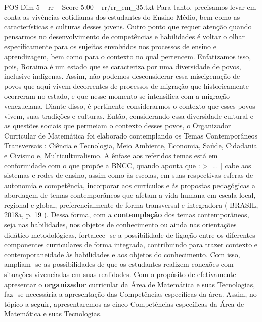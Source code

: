\begin{textsample}{POS Dim 5 – rr – Score 5.00 – rr/rr\_em\_35.txt}
Para tanto, precisamos levar em conta as vivências cotidianas dos estudantes do Ensino Médio, bem como as características e culturas desses jovens.
Outro ponto que requer atenção quando pensarmos no desenvolvimento de competências e habilidades é voltar o olhar especificamente para os sujeitos envolvidos nos processos de ensino e aprendizagem, bem como para o contexto no qual pertencem.
Enfatizamos isso, pois, Roraima é um estado que se caracteriza por uma diversidade de povos, inclusive indígenas.
Assim, não podemos desconsiderar essa miscigenação de povos que aqui vivem decorrentes de processos de migração que historicamente ocorreram no estado, e que nesse momento se intensifica com a migração venezuelana.
Diante disso, é pertinente considerarmos o contexto que esses povos vivem, suas tradições e culturas.
Então, considerando essa diversidade cultural e as questões sociais que permeiam o contexto desses povos, o Organizador Curricular de Matemática foi elaborado contemplando os Temas Contemporâneos Transversais : Ciência e Tecnologia, Meio Ambiente, Economia, Saúde, Cidadania e Civismo e, Multiculturalismo.
A ênfase aos referidos temas está em conformidade com o que propõe a BNCC, quando aponta que : > [... ] cabe aos sistemas e redes de ensino, assim como às escolas, em suas respectivas esferas de autonomia e competência, incorporar aos currículos e às propostas pedagógicas a abordagem de temas contemporâneos que afetam a vida humana em escala local, regional e global, preferencialmente de forma transversal e integradora ( BRASIL, 2018a, p. 19 ).
Dessa forma, com a \textbf{contemplação} dos temas contemporâneos, seja nas habilidades, nos objetos de conhecimento ou ainda nas orientações didático metodológicas, fortalece -se a possibilidade de ligação entre os diferentes componentes curriculares de forma integrada, contribuindo para trazer contexto e contemporaneidade às habilidades e aos objetos do conhecimento.
Com isso, ampliam -se as possibilidades de que os estudantes realizem conexões com situações vivenciadas em suas realidades.
Com o propósito de efetivamente apresentar o \textbf{organizador} curricular da Área de Matemática e suas Tecnologias, faz -se necessária a apresentação das Competências específicas da área.
Assim, no tópico a seguir, apresentaremos as cinco Competências específicas da Área de Matemática e suas Tecnologias.

\end{textsample}
